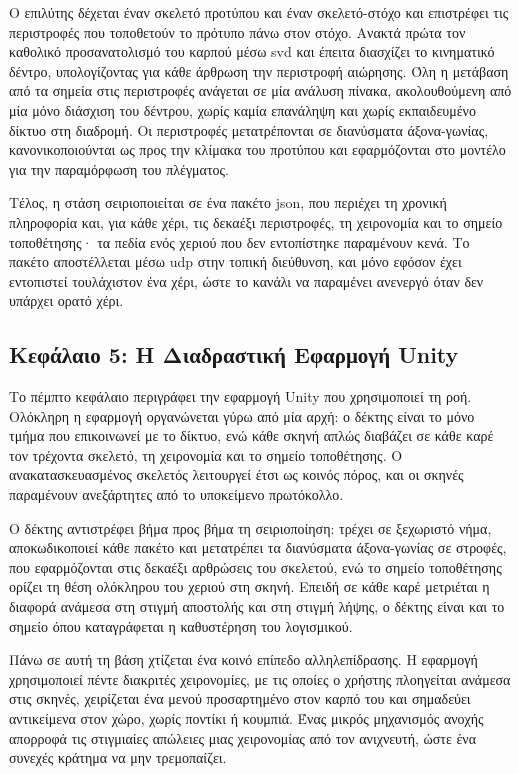 Ο επιλύτης δέχεται έναν σκελετό προτύπου και έναν σκελετό-στόχο και επιστρέφει
τις περιστροφές που τοποθετούν το πρότυπο πάνω στον στόχο. Ανακτά πρώτα τον
καθολικό προσανατολισμό του καρπού μέσω \acrshort{svd} και έπειτα διασχίζει το
κινηματικό δέντρο, υπολογίζοντας για κάθε άρθρωση την περιστροφή αιώρησης. Όλη
η μετάβαση από τα σημεία στις περιστροφές ανάγεται σε μία ανάλυση πίνακα,
ακολουθούμενη από μία μόνο διάσχιση του δέντρου, χωρίς καμία επανάληψη και
χωρίς εκπαιδευμένο δίκτυο στη διαδρομή. Οι περιστροφές μετατρέπονται σε
διανύσματα άξονα-γωνίας, κανονικοποιούνται ως προς την κλίμακα του προτύπου και
εφαρμόζονται στο μοντέλο για την παραμόρφωση του πλέγματος.

Τέλος, η στάση σειριοποιείται σε ένα πακέτο \acrshort{json}, που περιέχει τη
χρονική πληροφορία και, για κάθε χέρι, τις δεκαέξι περιστροφές, τη χειρονομία και το
σημείο τοποθέτησης· τα πεδία ενός χεριού που δεν εντοπίστηκε παραμένουν κενά.
Το πακέτο αποστέλλεται μέσω \acrshort{udp} στην τοπική διεύθυνση, και μόνο
εφόσον έχει εντοπιστεί τουλάχιστον ένα χέρι, ώστε το κανάλι να παραμένει
ανενεργό όταν δεν υπάρχει ορατό χέρι.



\subsection*{Κεφάλαιο 5: Η Διαδραστική Εφαρμογή Unity}

Το πέμπτο κεφάλαιο περιγράφει την εφαρμογή Unity που χρησιμοποιεί τη ροή.
Ολόκληρη η εφαρμογή οργανώνεται γύρω από μία αρχή: ο δέκτης είναι το μόνο τμήμα
που επικοινωνεί με το δίκτυο, ενώ κάθε σκηνή απλώς διαβάζει σε κάθε καρέ τον
τρέχοντα σκελετό, τη χειρονομία και το σημείο τοποθέτησης. Ο ανακατασκευασμένος
σκελετός λειτουργεί έτσι ως κοινός πόρος, και οι σκηνές παραμένουν ανεξάρτητες
από το υποκείμενο πρωτόκολλο.

Ο δέκτης αντιστρέφει βήμα προς βήμα τη σειριοποίηση: τρέχει σε ξεχωριστό νήμα,
αποκωδικοποιεί κάθε πακέτο και μετατρέπει τα διανύσματα άξονα-γωνίας σε στροφές,
που εφαρμόζονται στις δεκαέξι αρθρώσεις του σκελετού, ενώ το σημείο τοποθέτησης
ορίζει τη θέση ολόκληρου του χεριού στη σκηνή. Επειδή σε κάθε καρέ μετριέται η
διαφορά ανάμεσα στη στιγμή αποστολής και στη στιγμή λήψης, ο δέκτης είναι και
το σημείο όπου καταγράφεται η καθυστέρηση του λογισμικού.

Πάνω σε αυτή τη βάση χτίζεται ένα κοινό επίπεδο αλληλεπίδρασης. Η εφαρμογή
χρησιμοποιεί πέντε διακριτές χειρονομίες, με τις οποίες ο χρήστης πλοηγείται
ανάμεσα στις σκηνές, χειρίζεται ένα μενού προσαρτημένο στον καρπό του και
σημαδεύει αντικείμενα στον χώρο, χωρίς ποντίκι ή κουμπιά. Ένας μικρός
μηχανισμός ανοχής απορροφά τις στιγμιαίες απώλειες μιας χειρονομίας από τον
ανιχνευτή, ώστε ένα συνεχές κράτημα να μην τρεμοπαίζει.

